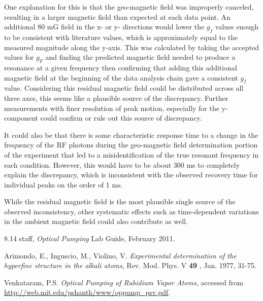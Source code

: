 One explanation for this is that the geo-magnetic field was improperly canceled, resulting in a larger magnetic field than expected at each data point. An additional 80 mG field in the x- or y- directions would lower the $g_f$ values enough to be consistent with literature values, which is approximately equal to the measured magnitude along the y-axis. This was calculated by taking the accepted values for $g_F$ and finding the predicted magnetic field needed to produce a resonance at a given frequency then confirming that adding this additional magnetic field at the beginning of the data analysis chain gave a consistent $g_f$ value. Considering this residual magnetic field could be distributed across all three axes, this seems like a plausible source of the discrepancy. Further measurements with finer resolution of peak motion, especially for the y-component could confirm or rule out this source of discrepancy. 

It could also be that there is some characteristic response time to a change in the frequency of the RF photons during the geo-magnetic field determination portion of the experiment that led to a misidentification of the true resonant frequency in each condition. However, this would have to be about 300 ms to completely explain the discrepancy, which is inconsistent with the observed recovery time for individual peaks on the order of 1 ms. 

While the residual magnetic field is the most plausible single source of the observed inconsistency, other systematic effects such as time-dependent variations in the ambient magnetic field could also contribute as well.

\begin{thebibliography}{3}

8.14 staff, \emph{Optical Pumping} Lab Guide, February 2011. 

Arimondo, E., Inguscio, M., Violino, V. \emph{Experimental determination of the hyperfine structure in the alkali atoms}, Rev. Mod. Phys. V \textbf{49 }, Jan. 1977, 31-75. 

Venkataram, P.S. \emph{Optical Pumping of Rubidium Vapor Atoms}, accessed from \url{http://web.mit.edu/pshanth/www/oppump_psv.pdf}. 

\end{thebibliography}


